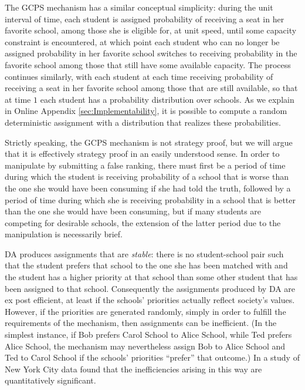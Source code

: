 \documentclass[12pt, A4paper]{article}
\theoremstyle{definition}
\begin{document}
The GCPS mechanism has a similar conceptual simplicity: during the unit interval of time, each student is assigned probability of receiving a seat in her favorite school, among those she is eligible for, at unit speed, until some capacity constraint is encountered, at which point each student who can no longer be assigned probability in her favorite school switches to receiving probability in the favorite school among those that still have some available capacity.  The process continues similarly, with each student at each time receiving probability of receiving a seat in her favorite school among those that are still available, so that at time $1$ each student has a probability distribution over schools.  As we explain in Online Appendix \ref{sec:Implementability}, it is possible to compute a random deterministic assignment with a distribution that realizes these probabilities.

Strictly speaking, the GCPS mechanism is not strategy proof, but we will argue that it is effectively strategy proof in an easily understood sense.  In order to manipulate by submitting a false ranking, there must first be a period of time during which the student is receiving probability of a school that is worse than the one she would have been consuming if she had told the truth, followed by a period of time during which she is receiving probability in a school that is better than the one she would have been consuming, but if many students are competing for desirable schools, the extension of the latter period due to the manipulation is necessarily brief.

DA produces assignments that are \emph{stable}: there is no student-school pair such that the student prefers that school to the one she has been matched with and the student has a higher priority at that school than some other student that has been assigned to that school.  Consequently the assignments produced by DA are ex post efficient, at least if the schools' priorities actually reflect society's values.  However, if the priorities are generated randomly, simply in order to fulfill the requirements of the mechanism, then assignments can be inefficient.  (In the simplest instance, if Bob prefers Carol School to Alice School, while Ted prefers Alice School, the mechanism may nevertheless assign Bob to Alice School and Ted to Carol School if the schools' priorities ``prefer'' that outcome.) In a study of New York City data \cite{apr09aer} found that the inefficiencies arising in this way are quantitatively significant.
\end{document}
